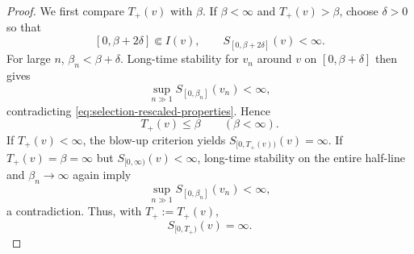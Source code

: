 \documentclass{interact}
\numberwithin{equation}{section}
\theoremstyle{plain}
\theoremstyle{definition}
\theoremstyle{remark}
\begin{document}
\begin{proof}
We first compare $T_+(v)$ with $\beta$. If $\beta<\infty$ and $T_+(v)>\beta$, choose $\delta>0$ so that
\[
 [0,\beta+2\delta]\Subset I(v),
 \qquad
 S_{[0,\beta+2\delta]}(v)<\infty.
\]
For large $n$, $\beta_n<\beta+\delta$. Long-time stability for $v_n$ around $v$ on $[0,\beta+\delta]$ then gives
\[
 \sup_{n\gg1}S_{[0,\beta_n]}(v_n)<\infty,
\]
contradicting \eqref{eq:selection-rescaled-properties}. Hence
\begin{equation}\label{eq:selection-lifespan-upper}
 T_+(v)\le\beta
 \qquad(\beta<\infty).
\end{equation}
If $T_+(v)<\infty$, the blow-up criterion yields $S_{[0,T_+(v))}(v)=\infty$. If $T_+(v)=\beta=\infty$ but $S_{[0,\infty)}(v)<\infty$, long-time stability on the entire half-line and $\beta_n\to\infty$ again imply
\[
 \sup_{n\gg1}S_{[0,\beta_n]}(v_n)<\infty,
\]
a contradiction. Thus, with $T_+:=T_+(v)$,
\begin{equation}\label{eq:selection-limit-blowup}
 S_{[0,T_+)}(v)=\infty.
\end{equation}


\end{proof}
\end{document}
